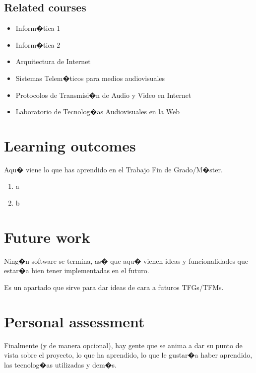 \documentclass[a4paper, 12pt]{book}
\begin{document}
\subsection{Related courses}
\begin{itemize}
  \item Inform�tica 1
  \item Inform�tica 2
  \item Arquitectura de Internet
  \item Sistemas Telem�ticos para medios audiovisuales
  \item Protocolos de Transmisi�n de Audio y Video en Internet
  \item Laboratorio de Tecnolog�as Audiovisuales en la Web
\end{itemize}


\section{Learning outcomes}
\label{sec:lecciones_aprendidas}

Aqu� viene lo que has aprendido en el Trabajo Fin de Grado/M�ster.

\begin{enumerate}
  \item a
  \item b
\end{enumerate}


\section{Future work}
\label{sec:trabajos_futuros}

Ning�n software se termina, as� que aqu� vienen ideas y funcionalidades
que estar�a bien tener implementadas en el futuro.

Es un apartado que sirve para dar ideas de cara a futuros TFGs/TFMs.


\section{Personal assessment}
\label{sec:valoracion}

Finalmente (y de manera opcional), hay gente que se anima a dar su punto de
vista sobre el proyecto, lo que ha aprendido, lo que le gustar�a haber aprendido,
las tecnolog�as utilizadas y dem�s.



\end{document}
